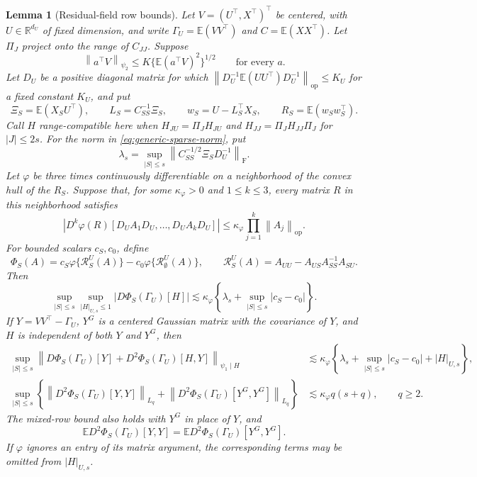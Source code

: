 \documentclass[a4paper,11pt,english]{article}
\newtheorem{lemma}[theorem]{Lemma}
\newcommand{\E}{\mathbb E}
\newcommand{\norm}[1]{\left\lVert #1\right\rVert}
\newcommand{\R}{\mathbb R}
\begin{document}
\begin{lemma}[Residual-field row bounds]
\label{lem:residual-field-row-bounds}
Let $V=(U^\top,X^\top)^\top$ be centered, with
$U\in\R^{d_U}$ of fixed dimension, and write
$\Gamma_U=\E(VV^\top)$ and $C=\E(XX^\top)$.  Let $\Pi_J$ project onto
the range of $C_{JJ}$.  Suppose
\[
 \norm{a^\top V}_{\psi_2}\le K\{\E(a^\top V)^2\}^{1/2}
 \qquad\text{for every }a.
\]
Let $D_U$ be a positive diagonal matrix for which
$\norm{D_U^{-1}\E(UU^\top)D_U^{-1}}_{\mathrm{op}}\le K_U$ for a fixed
constant $K_U$, and put
\[
 \Xi_S=\E(X_SU^\top),\qquad
 L_S=C_{SS}^{-1}\Xi_S,\qquad
 w_S=U-L_S^\top X_S,\qquad
 R_S=\E(w_Sw_S^\top).
\]
Call $H$ range-compatible here when
$H_{JU}=\Pi_JH_{JU}$ and $H_{JJ}=\Pi_JH_{JJ}\Pi_J$ for $|J|\le2s$.
For the norm in \eqref{eq:generic-sparse-norm}, put
\begin{equation}\label{eq:residual-field-scale}
 \lambda_s=\sup_{|S|\le s}
 \norm{C_{SS}^{-1/2}\Xi_SD_U^{-1}}_{\mathrm F}.
\end{equation}
Let $\varphi$ be three times continuously differentiable on a
neighborhood of the convex hull of the $R_S$.  Suppose that, for some
$\kappa_\varphi>0$ and $1\le k\le3$, every matrix $R$ in this
neighborhood satisfies
\begin{equation}\label{eq:standardized-target-derivatives}
 \left|D^k\varphi(R)[D_UA_1D_U,\ldots,D_UA_kD_U]\right|
 \le\kappa_\varphi\prod_{j=1}^k\norm{A_j}_{\mathrm{op}}.
\end{equation}
For bounded scalars $c_S,c_0$, define
\begin{equation}\label{eq:generic-residual-functional}
 \Phi_S(A)=c_S\varphi\{\mathcal R_S^U(A)\}
 -c_0\varphi\{\mathcal R_\emptyset^U(A)\},
 \qquad
 \mathcal R_S^U(A)=A_{UU}-A_{US}A_{SS}^{-1}A_{SU}.
\end{equation}
Then
\begin{equation}\label{eq:residual-field-derivative-bound}
 \sup_{|S|\le s}\sup_{|H|_{U,s}\le1}
 |D\Phi_S(\Gamma_U)[H]|
 \lesssim\kappa_\varphi
 \left\{\lambda_s+\sup_{|S|\le s}|c_S-c_0|\right\}.
\end{equation}
If $Y=VV^\top-\Gamma_U$, $Y^G$ is a centered Gaussian matrix with the
covariance of $Y$, and $H$ is independent of both $Y$ and $Y^G$, then
\begin{align}
 \sup_{|S|\le s}
 \norm{D\Phi_S(\Gamma_U)[Y]+D^2\Phi_S(\Gamma_U)[H,Y]}_{\psi_1\mid H}
 &\lesssim\kappa_\varphi\left\{
 \lambda_s+\sup_{|S|\le s}|c_S-c_0|+|H|_{U,s}\right\},
 \label{eq:residual-field-mixed-row-bound}\\
 \sup_{|S|\le s}\left\{
 \norm{D^2\Phi_S(\Gamma_U)[Y,Y]}_{L_q}
 +\norm{D^2\Phi_S(\Gamma_U)[Y^G,Y^G]}_{L_q}\right\}
 &\lesssim\kappa_\varphi q(s+q),\qquad q\ge2.
 \label{eq:residual-field-diagonal-bound}
\end{align}
The mixed-row bound also holds with $Y^G$ in place of $Y$, and
\begin{equation}\label{eq:residual-field-diagonal-mean}
 \E D^2\Phi_S(\Gamma_U)[Y,Y]
 =\E D^2\Phi_S(\Gamma_U)[Y^G,Y^G].
\end{equation}
If $\varphi$ ignores an entry of its matrix argument, the corresponding
terms may be omitted from $|H|_{U,s}$.
\end{lemma}
\end{document}
